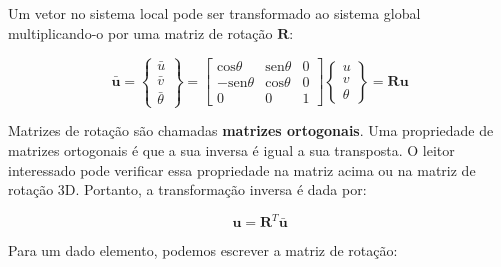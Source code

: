         Um vetor no sistema local pode ser transformado ao sistema global multiplicando-o por uma matriz de rotação $\mathbf{R}$:

        \begin{equation}
            \mathbf{\bar{u}} = 
            \begin{Bmatrix}
                \bar{u}\\
                \bar{v}\\
                \bar{\theta}
            \end{Bmatrix}
            =
            \begin{bmatrix}
                \text{cos} \theta & \text{sen} \theta & 0\\
                -\text{sen} \theta & \text{cos} \theta & 0\\
                0 & 0 & 1
            \end{bmatrix}
            \begin{Bmatrix}
                u\\
                v\\
                \theta
            \end{Bmatrix}=
            \mathbf{R} \mathbf{u}
        \end{equation}

        Matrizes de rotação são chamadas \textbf{matrizes ortogonais}. Uma propriedade de matrizes ortogonais é que a sua inversa é igual a sua transposta. O leitor interessado pode verificar essa propriedade na matriz acima ou na matriz de rotação 3D. Portanto, a transformação inversa é dada por:

        \begin{equation}
            \mathbf{u} = \mathbf{R}^T \mathbf{\bar{u}}
        \end{equation}

        Para um dado elemento, podemos escrever a matriz de rotação:

